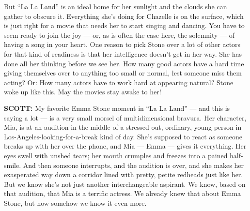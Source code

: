 But ``La La Land'' is an ideal home for her sunlight and the clouds she
can gather to obscure it. Everything she's doing for Chazelle is on the
surface, which is just right for a movie that needs her to start singing
and dancing. You have to seem ready to join the joy --- or, as is often
the case here, the solemnity --- of having a song in your heart. One
reason to pick Stone over a lot of other actors for that kind of
readiness is that her intelligence doesn't get in her way. She has done
all her thinking before we see her. How many good actors have a hard
time giving themselves over to anything too small or normal, lest
someone miss them acting? Or: How many actors have to work hard at
appearing natural? Stone woke up like this. May the movies stay awake to
her!

\textbf{SCOTT:} My favorite Emma Stone moment in ``La La Land'' --- and
this is saying a lot --- is a very small morsel of multidimensional
bravura. Her character, Mia, is at an audition in the middle of a
stressed-out, ordinary, young-person-in-Los-Angeles-looking-for-a-break
kind of day. She's supposed to react as someone breaks up with her over
the phone, and Mia --- Emma --- gives it everything. Her eyes swell with
unshed tears; her mouth crumples and freezes into a pained half-smile.
And then someone interrupts, and the audition is over, and she makes her
exasperated way down a corridor lined with pretty, petite redheads just
like her. But we know she's not just another interchangeable aspirant.
We know, based on that audition, that Mia is a terrific actress. We
already knew that about Emma Stone, but now somehow we know it even
more.


